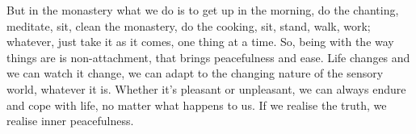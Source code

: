 But in the monastery what we do is to get up in the morning, do the chanting, meditate, sit, clean the monastery, do the cooking, sit, stand, walk, work; whatever, just take it as it comes, one thing at a time. So, being with the way things are is non-attachment, that brings peacefulness and ease. Life changes and we can watch it change, we can adapt to the changing nature of the sensory world, whatever it is. Whether it's pleasant or unpleasant, we can always endure and cope with life, no matter what happens to us. If we realise the truth, we realise inner peacefulness.

